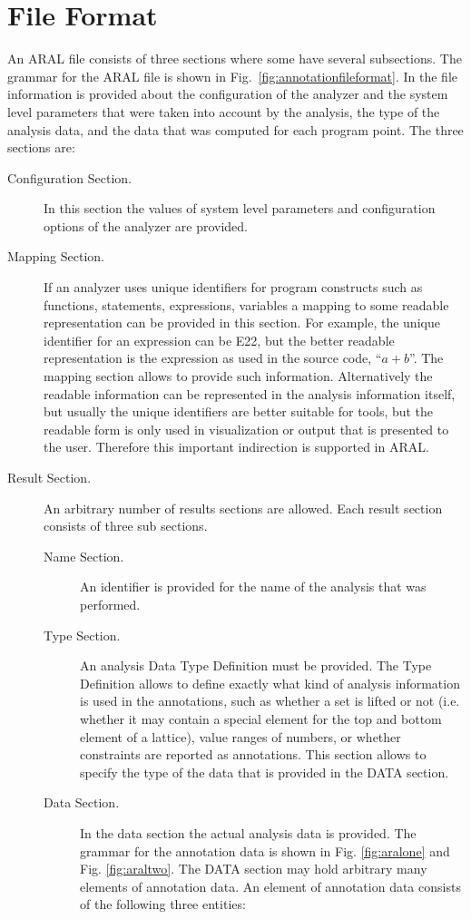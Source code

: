 \documentclass[a4paper,12pt]{report}
\begin{document}
\section{File Format}

An ARAL file consists of three sections where some have several subsections. The grammar for the ARAL file
is shown in Fig.~\ref{fig:annotationfileformat}. In the file
information is provided about the configuration of the analyzer and
the system level parameters that were taken into account by the
analysis, the type of the analysis data, and the data that was
computed for each program point. The three sections are:

\begin{description}
\item [Configuration Section.] In this section the values of system
level parameters and configuration options of the analyzer are
provided.
\item [Mapping Section.] If an analyzer uses unique identifiers for
program constructs such as functions, statements, expressions,
variables a mapping to some readable representation can be provided in
this section. For example, the unique identifier for an expression can
be E22, but the better readable representation is the expression as
used in the source code, ``$a+b$''. The mapping section allows to
provide such information. Alternatively the readable information can
be represented in the analysis information itself, but usually the
unique identifiers are better suitable for tools, but the readable
form is only used in visualization or output that is presented to the
user. Therefore this important indirection is supported in ARAL.
\item [Result Section.] An arbitrary number of results sections are allowed.
Each result section consists of three sub sections.

\begin{description}
\item [Name Section.] An identifier is provided for the name of the analysis that was performed.
\item [Type Section.] An analysis Data Type Definition must be
provided.  The Type Definition allows to define exactly what kind of
analysis information is used in the annotations, such as whether a set
is lifted or not (i.e. whether it may contain a special element for
the top and bottom element of a lattice), value ranges of numbers, or
whether constraints are reported as annotations. This section allows
to specify the type of the data that is provided in the DATA section.
\item [Data Section.]
In the data section the actual analysis data is provided. The grammar
for the annotation data is shown in Fig. \ref{fig:aralone} and
Fig. \ref{fig:araltwo}. The DATA section may hold arbitrary many
elements of annotation data. An element of annotation data consists of the following three entities:


\end{description}
\end{description}
\end{document}
